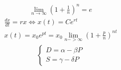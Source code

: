 \documentclass{article}
\begin{document}
    \begin{gather}\label{tak}
        \lim_{n\rightarrow \infty}\left(1+\frac{1}{n}\right)^n=e
    \end{gather}
    \begin{gather}
        \frac{dx}{dt} = rx \iff x(t)=Ce^{rt}\\
        x(t)=x_0e^{pt} = x_0 \lim_{n->\infty} \left( 1+\frac{p}{n} \right)^{n t}
    \end{gather}
    \begin{align*}\left\{  
        \begin{matrix}
            D = \alpha - \beta P \\
            S = \gamma - \delta P
        \end{matrix}\right.
    \end{align*}   
    
\end{document}

